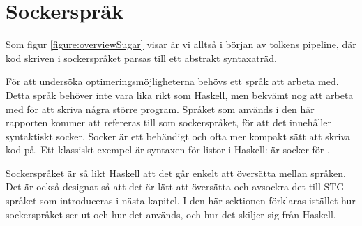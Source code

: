\documentclass[Rapport]{subfiles}
\begin{document}
\chapter{Sockerspråk}
\label{sec:Socker}

%
%
%
%
%
%
%

%





\overviewSugar

Som figur \ref{figure:overviewSugar} visar är vi alltså i början av tolkens pipeline, där kod skriven i sockerspråket parsas till ett abstrakt syntaxaträd.

För att undersöka optimeringsmöjligheterna behövs ett språk att arbeta med. 
Detta språk behöver inte vara lika rikt som Haskell, men bekvämt nog
att arbeta med för att skriva några större program. Språket som används i den
här rapporten kommer att refereras till som sockerspråket, för att det 
innehåller syntaktiskt socker. Socker är ett behändigt och ofta mer kompakt sätt 
att skriva kod på. Ett klassiskt exempel är syntaxen
för listor i Haskell: \miniCode{[5,0,4]} är socker för .

Sockerspråket är så likt Haskell att det går enkelt att översätta mellan språken.
Det är också designat så att det är lätt att översätta och avsockra det till 
STG-språket som introduceras i nästa kapitel. I den här sektionen
förklaras istället hur sockerspråket ser ut och hur det används, och hur
det skiljer sig från Haskell.
\end{document}
